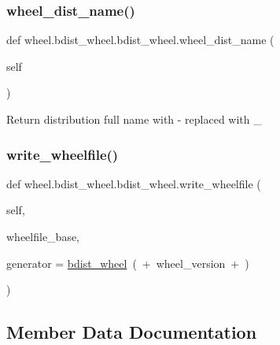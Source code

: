 \subsubsection{\texorpdfstring{wheel\+\_\+dist\+\_\+name()}{wheel\_dist\_name()}}
{\footnotesize\ttfamily def wheel.\+bdist\+\_\+wheel.\+bdist\+\_\+wheel.\+wheel\+\_\+dist\+\_\+name (\begin{DoxyParamCaption}\item[{}]{self }\end{DoxyParamCaption})}

\begin{DoxyVerb}Return distribution full name with - replaced with _\end{DoxyVerb}
 \mbox{\label{classwheel_1_1bdist__wheel_1_1bdist__wheel_a9c34b4a4a9f70461e6feb9ca086e7b59}} 
\subsubsection{\texorpdfstring{write\+\_\+wheelfile()}{write\_wheelfile()}}
{\footnotesize\ttfamily def wheel.\+bdist\+\_\+wheel.\+bdist\+\_\+wheel.\+write\+\_\+wheelfile (\begin{DoxyParamCaption}\item[{}]{self,  }\item[{}]{wheelfile\+\_\+base,  }\item[{}]{generator = {\ttfamily \textquotesingle{}\hyperlink{classwheel_1_1bdist__wheel_1_1bdist__wheel}{bdist\+\_\+wheel}~(\textquotesingle{}~+~wheel\+\_\+version~+~\textquotesingle{})\textquotesingle{}} }\end{DoxyParamCaption})}



\subsection{Member Data Documentation}
\mbox{\label{classwheel_1_1bdist__wheel_1_1bdist__wheel_a67064f9cc30fd092e58825cce247a6a0}} 
